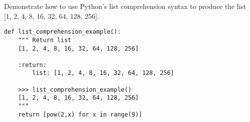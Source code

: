  \label{sssec:ex1_11}

Demonstrate how to use Python's list comprehension syntax to produce the list [1, 2, 4, 8, 16, 32, 64, 128, 256].

\begin{lstlisting}[title=Exercise R-1.11]
def list_comprehension_example():
    """ Return list
    [1, 2, 4, 8, 16, 32, 64, 128, 256]

    :return:
        list: [1, 2, 4, 8, 16, 32, 64, 128, 256]

    >>> list_comprehension_example()
    [1, 2, 4, 8, 16, 32, 64, 128, 256]
    """
    return [pow(2,x) for x in range(9)]
\end{lstlisting}